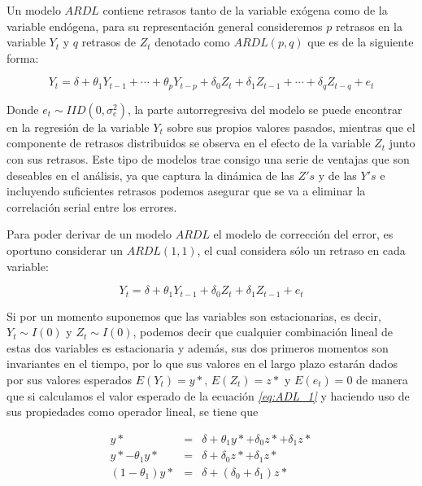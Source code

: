 Un modelo $ARDL$ contiene retrasos tanto de la variable exógena como de la variable endógena, para su representación general consideremos $p$ retrasos en la variable $Y_t$ y $q$ retrasos de $Z_t$ denotado como $ARDL(p,q)$ que es de la siguiente forma:

\begin{equation}
Y_t=\delta + \theta_1 Y_{t-1} + \cdots + \theta_p Y_{t-p} + \delta_0 Z_t + \delta_1 Z_{t-1} + \cdots + \delta_q Z_{t-q} + e_t  \label{eq:ADL}
\end{equation}
 
 Donde $e_t\sim IID(0,\sigma^2_e)$, la parte autorregresiva del modelo se puede encontrar en la regresión de la variable $Y_t$ sobre sus propios valores pasados, mientras que el componente de retrasos distribuidos se observa en el efecto de la variable $Z_t$ junto con sus retrasos. Este tipo de modelos trae consigo una serie de ventajas que son deseables en el análisis, ya que captura la dinámica de las $Z's$ y de las $Y's$ e incluyendo suficientes retrasos podemos asegurar que se va a eliminar la correlación serial entre los errores. \bigskip
 
 Para poder derivar de un modelo $ARDL$ el modelo de corrección del error, es oportuno considerar un $ARDL(1,1)$, el cual considera sólo un retraso en cada variable:
 
 \begin{equation}
Y_t=\delta + \theta_1 Y_{t-1} + \delta_0 Z_t + \delta_1 Z_{t-1}  + e_t  \label{eq:ADL_1}
\end{equation}
 
 Si por un momento suponemos que las variables son estacionarias, es decir, $Y_t \sim I(0)$ y $Z_t \sim I(0)$, podemos decir que cualquier combinación lineal de estas dos variables es estacionaria y además, sus dos primeros momentos son invariantes en el tiempo, por lo que sus valores en el largo plazo estarán dados por sus valores esperados $E(Y_t)=y*$, $E(Z_t)=z*$ y $E(e_t)=0$ de manera que si calculamos el valor esperado de la ecuación   \textit{\ref{eq:ADL_1}}  y haciendo uso de sus propiedades como operador lineal, se tiene que
 
 \begin{eqnarray}
y*&=&\delta + \theta_1 y*  + \delta_0 z* + \delta_1 z* \nonumber  \\
 y*- \theta_1 y* &=& \delta + \delta_0 z* + \delta_1 z*  \\
 (1-\theta_1) y* &=& \delta + (\delta_0 + \delta_1)z* \nonumber 
\end{eqnarray}

